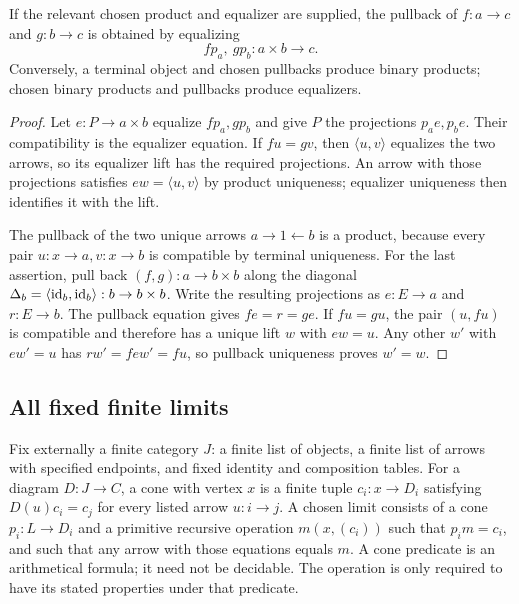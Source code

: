 \begin{proposition}
If the relevant chosen product and equalizer are supplied, the pullback of
$f:a\to c$ and $g:b\to c$ is obtained by equalizing
\[
 f p_a,\ g p_b:a\times b\longrightarrow c.
\]
Conversely, a terminal object and chosen pullbacks produce binary products;
chosen binary products and pullbacks produce equalizers.
\end{proposition}
\begin{proof}
Let $e:P\to a\times b$ equalize $fp_a,gp_b$ and give $P$ the projections
$p_a e,p_b e$.  Their compatibility is the equalizer equation.  If $fu=gv$,
then $\langle u,v\rangle$ equalizes the two arrows, so its equalizer lift has
the required projections.  An arrow with those projections satisfies
$ew=\langle u,v\rangle$ by product uniqueness; equalizer uniqueness then
identifies it with the lift.

The pullback of the two unique arrows $a\to1\leftarrow b$ is a product,
because every pair $u:x\to a,v:x\to b$ is compatible by terminal uniqueness.
For the last assertion, pull back $(f,g):a\to b\times b$ along the diagonal
$\Delta_b=\langle\operatorname{id}_b,\operatorname{id}_b\rangle:b\to b\times b$.  Write the resulting
projections as $e:E\to a$ and $r:E\to b$.  The pullback equation gives
$fe=r=ge$.  If $fu=gu$, the pair $(u,fu)$ is compatible and therefore has a
unique lift $w$ with $ew=u$.  Any other $w'$ with $ew'=u$ has
$rw'=few'=fu$, so pullback uniqueness proves $w'=w$.
\end{proof}

\subsection{All fixed finite limits}

Fix externally a finite category $J$: a finite list of objects, a finite list
of arrows with specified endpoints, and fixed identity and composition
tables.  For a diagram $D:J\to C$, a cone with vertex $x$ is a finite tuple
$c_i:x\to D_i$ satisfying $D(u)c_i=c_j$ for every listed arrow $u:i\to j$.
A chosen limit consists of a cone $p_i:L\to D_i$ and a primitive recursive
operation $m(x,(c_i))$ such that $p_i m=c_i$, and such that any arrow with
those equations equals $m$.  A cone predicate is an arithmetical formula; it
need not be decidable.  The operation is only required to have its stated
properties under that predicate.

